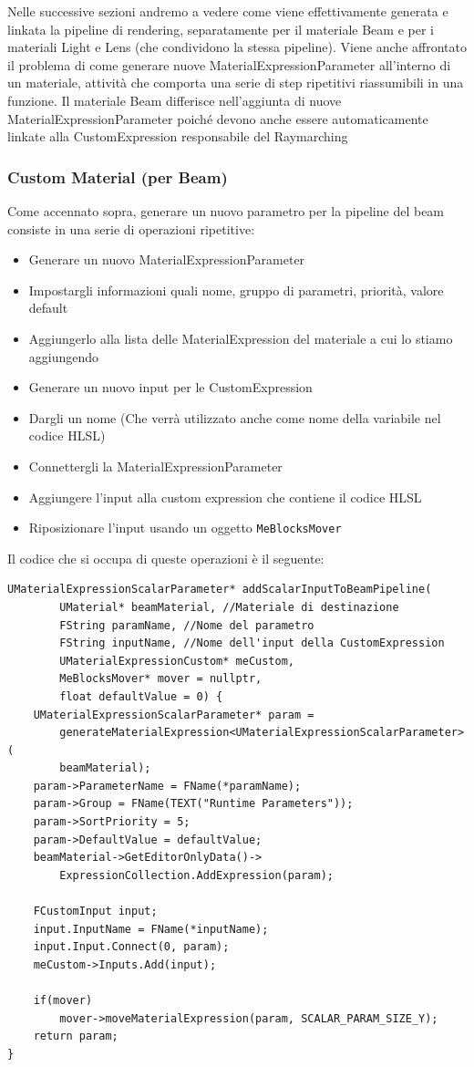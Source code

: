 \documentclass[main.tex]{subfiles}
\begin{document}
Nelle successive sezioni andremo a vedere come viene effettivamente generata e linkata la pipeline di rendering, separatamente per il materiale Beam e per i materiali Light e Lens (che condividono la stessa pipeline). Viene anche affrontato il problema di come generare nuove MaterialExpressionParameter all'interno di un materiale, attività che comporta una serie di step ripetitivi riassumibili in una funzione. Il materiale Beam differisce nell'aggiunta di nuove MaterialExpressionParameter poiché devono anche essere automaticamente linkate alla CustomExpression responsabile del Raymarching

\subsubsection{Custom Material (per Beam)}\label{subsec:2_3_CM}
Come accennato sopra, generare un nuovo parametro per la pipeline del beam consiste in una serie di operazioni ripetitive:
\begin{itemize}
    \item Generare un nuovo MaterialExpressionParameter
    \item Impostargli informazioni quali nome, gruppo di parametri, priorità, valore default
    \item Aggiungerlo alla lista delle MaterialExpression del materiale a cui lo stiamo aggiungendo
    \item Generare un nuovo input per le CustomExpression
    \item Dargli un nome (Che verrà utilizzato anche come nome della variabile nel codice HLSL)
    \item Connettergli la MaterialExpressionParameter
    \item Aggiungere l'input alla custom expression che contiene il codice HLSL
    \item Riposizionare l'input usando un oggetto \lstinline{MeBlocksMover}
\end{itemize}
Il codice che si occupa di queste operazioni è il seguente:
\begin{lstlisting}
UMaterialExpressionScalarParameter* addScalarInputToBeamPipeline(
        UMaterial* beamMaterial, //Materiale di destinazione
        FString paramName, //Nome del parametro
        FString inputName, //Nome dell'input della CustomExpression
        UMaterialExpressionCustom* meCustom,
        MeBlocksMover* mover = nullptr,
        float defaultValue = 0) {
    UMaterialExpressionScalarParameter* param =
        generateMaterialExpression<UMaterialExpressionScalarParameter>(
        beamMaterial);
    param->ParameterName = FName(*paramName);
    param->Group = FName(TEXT("Runtime Parameters"));
    param->SortPriority = 5;
    param->DefaultValue = defaultValue;
    beamMaterial->GetEditorOnlyData()->
        ExpressionCollection.AddExpression(param);

    FCustomInput input;
    input.InputName = FName(*inputName);
    input.Input.Connect(0, param);
    meCustom->Inputs.Add(input);

    if(mover)
        mover->moveMaterialExpression(param, SCALAR_PARAM_SIZE_Y);
    return param;
}
\end{lstlisting}
\end{document}
